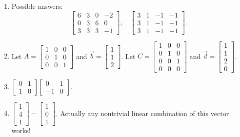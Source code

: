 \begin{enumerate}
\begin{enumerate}
\[				\sim \dots \sim\left[\!\!\begin{array}{cc|c}1 & 0 & 3\\ 0 & 1 & -1\\ 0 & 0 & 0\end{array}\!\!\right].\]
				\textbf{Important:} Don't include the extra 0 in the end as part of your solution!
			\item It is one-to-one, but it's not onto.
		\end{enumerate}
	\item Possible answers: \[\begin{bmatrix}6 & 3 & 0 & -2 \\ 0 & 3 & 6 & 0 \\ 3 & 3 & 3 & -1\end{bmatrix}, \quad \begin{bmatrix}3 & 1 & -1 & -1 \\ 3 & 1 & -1 & -1 \\ 3 & 1 & -1 & -1\end{bmatrix}.\]
	\item Let \(A = \begin{bmatrix}1 & 0 & 0 \\ 0 & 1 & 0 \\ 0 & 0 & 1\end{bmatrix}\) and \(\vec{b} = \begin{bmatrix}1 \\ 1 \\ 2\end{bmatrix}\). Let 
		\(C = \begin{bmatrix}1 & 0 & 0 \\ 0 & 1 & 0 \\ 0 & 0 & 1 \\ 0 & 0 & 0\end{bmatrix}\) and \(\vec{d} = \begin{bmatrix}1 \\ 1 \\ 2 \\ 0\end{bmatrix}\).
	\item \(\begin{bmatrix}0 & 1 \\ 1 & 0\end{bmatrix}\begin{bmatrix}0 & 1 \\ -1 & 0\end{bmatrix}.\)
	\item \(\begin{bmatrix}1 \\ 4 \\ 1\end{bmatrix} - \begin{bmatrix}1 \\ 0 \\ 1\end{bmatrix}\). Actually any nontrivial linear combination of this vector works!
\end{enumerate}